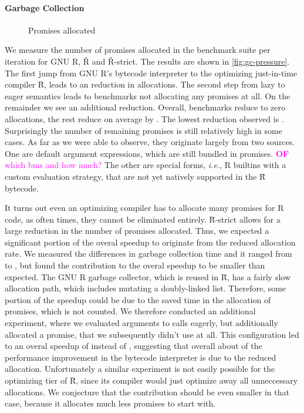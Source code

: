 \documentclass[review,nonacm,screen,acmsmall,anonymous=true]{acmart}
\newcommand{\authorcomment}[3]{\xspace\textcolor{#1}{{\bf #2} #3}\xspace}
\newcommand{\OF}[1]{\authorcomment{magenta}{OF}{#1}}
\renewcommand{\Rsh}{{\sf\u R}\xspace}
\newcommand{\Rshstrict}{{\sf\u R-strict}\xspace}
\newcommand{\ie}{\emph{i.e.},\xspace}
\begin{document}
\paragraph{Garbage Collection}

\begin{figure}[h]
  \centering
  
  \caption{Promises allocated}
  \label{fig:gc-pressure}
\end{figure}
We measure the number of promises allocated in the
benchmark suite per iteration for GNU R, Ř and Ř-strict. The results are shown in
\autoref{fig:gc-pressure}. The first jump from GNU R's bytecode interpreter to
the optimizing just-in-time compiler \Rsh, leads to an \promiseAlocationReductionGnurRsh
reduction in allocations. The second step
from lazy to eager semantics leads to \promiseAlocationReductionRshStrictToZero
benchmarks not allocating any promises at all. On the remainder we see an additional
\promiseAlocationReductionRshStrict reduction.
Overall, \promiseAlocationReductionRshStrictToZero benchmarks reduce to zero
allocations, the rest reduce on average by \promiseAlocationReductionGnurRshStrict.
The lowest reduction observed is
\promiseAlocationReductionGnurRshStrictMin.
Surprisingly the number of remaining promises is
still relatively high in some cases. As far as we were able to observe, they
originate largely from two sources. One are default argument expressions, which
are still bundled in promises. \OF{which bms and how much?} The other are special forms, 
\ie R builtins with a custom evaluation
strategy, that are not yet natively supported in the \Rsh bytecode.

It turns out even an optimizing compiler has to allocate many promises for R
code, as often times, they cannot be eliminated entirely. \Rshstrict allows for
a large reduction in the number of promises allocated.
Thus, we expected a significant portion of the overal speedup to originate from
the reduced allocation rate. We measured the differences in garbage collection
time and it ranged from \speedupGCRshStrictMin to \speedupGCRshStrictMax, but
found the contribution to the overal speedup to be smaller than expected.
The GNU R garbage collector, which is reused in \Rsh, has a fairly slow allocation path, which
includes mutating a doubly-linked list. Therefore, some portion of the speedup
could be due to the saved time in the allocation of promises, which is not counted.
We therefore conducted an additional experiment, where we evaluated arguments to
calls eagerly, but additionally allocated a promise, that we subsequently didn't
use at all. This configuration led to an overal speedup of
\speedupBCRshStrictAlloc instead of \speedupBCRshStrict, suggesting that overall
about \speedupDueToReducedGC of the performance improvement in the bytecode interpreter is due to the
reduced allocation. Unfortunately a similar experiment is not easily possible
for the optimizing tier of \Rsh, since its compiler would just optimize away all
unneccessary allocations. We conjecture that the contribution should be even
smaller in that case, because it allocates much less promises to start with.
\end{document}
